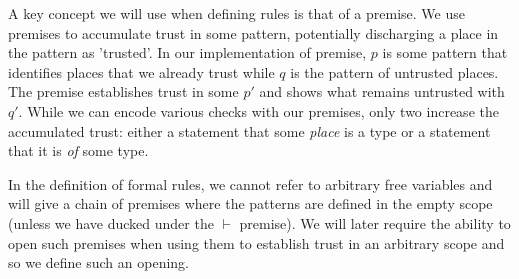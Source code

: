 A key concept we will use when defining rules is that of a premise. We use
premises to accumulate trust in some pattern, potentially discharging
a place in the pattern as 'trusted'. In our implementation of premise, $p$ is
some pattern that identifies places that we already trust while $q$ is the
pattern of untrusted places. The premise establishes trust in some $p'$ and
shows what remains untrusted with $q'$. While we can encode various checks with
our premises, only two increase the accumulated trust: either a statement that
some \emph{place} is a type or a statement that it is \emph{of} some type.

In the definition of formal rules, we cannot refer to arbitrary
free variables and will give a chain of premises where the patterns are defined
in the empty scope (unless we have ducked under the $\vdash$ premise). We will later
require the ability to open such premises when using them to establish trust in
an arbitrary scope and so we define such an opening.
